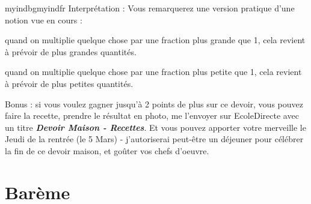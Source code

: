 \documentclass{exam}
\begin{document}
\begin{questions}

  \begin{Indication}{myindbg}{myindfr}
  Interprétation : 
   Vous remarquerez une version pratique d'une notion vue en cours : 
  \begin{compactitem}
    \item quand on multiplie quelque chose par une fraction plus grande que 1, cela revient à prévoir de plus grandes quantités.
    \item quand on multiplie quelque chose par une fraction plus petite que 1, cela revient à prévoir de plus petites quantités.
  \end{compactitem}
  \end{Indication}
  \question Bonus : si vous voulez gagner jusqu'à 2 points de plus sur ce devoir, vous pouvez faire la recette, prendre le résultat en photo, me l'envoyer sur EcoleDirecte avec un titre \textbf{\textit{Devoir Maison - Recettes}}. Et vous pouvez apporter votre merveille le Jeudi de la rentrée (le 5 Mars) - j'autoriserai peut-être un déjeuner pour célébrer la fin de ce devoir maison, et goûter vos chefs d'oeuvre.
  
\end{questions}

\section{Barème}

\renewcommand{\arraystretch}{1.6}
\end{document}
